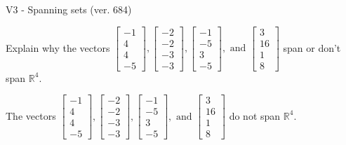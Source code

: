 \begin{exercise}
  \begin{exerciseTitle}V3 - Spanning sets (ver. 684)\end{exerciseTitle}
  \begin{exerciseStatement}
    Explain why the vectors \(\left[\begin{array}{r}
-1 \\
4 \\
4 \\
-5
\end{array}\right] , \left[\begin{array}{r}
-2 \\
-2 \\
-3 \\
-3
\end{array}\right] , \left[\begin{array}{r}
-1 \\
-5 \\
3 \\
-5
\end{array}\right] , \text{ and } \left[\begin{array}{r}
3 \\
16 \\
1 \\
8
\end{array}\right]\) span or don't span \(\mathbb{R}^4\). 
	


  \end{exerciseStatement}
  \begin{exerciseAnswer}
   The vectors \(\left[\begin{array}{r}
-1 \\
4 \\
4 \\
-5
\end{array}\right] , \left[\begin{array}{r}
-2 \\
-2 \\
-3 \\
-3
\end{array}\right] , \left[\begin{array}{r}
-1 \\
-5 \\
3 \\
-5
\end{array}\right] , \text{ and } \left[\begin{array}{r}
3 \\
16 \\
1 \\
8
\end{array}\right]\) 
  	 do not  
	span \(\mathbb{R}^4\).
  


  \end{exerciseAnswer}
\end{exercise}
